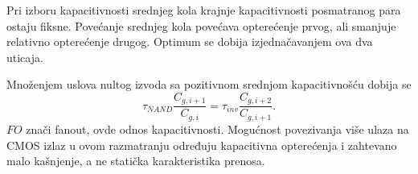 Pri izboru kapacitivnosti srednjeg kola krajnje kapacitivnosti posmatranog para ostaju fiksne. Povećanje srednjeg kola povećava opterećenje prvog, ali smanjuje relativno opterećenje drugog. Optimum se dobija izjednačavanjem ova dva uticaja.

Množenjem uslova nultog izvoda sa pozitivnom srednjom kapacitivnošću dobija se
\[\tau_{NAND}\frac{C_{g,i+1}}{C_{g,i}}=
\tau_{inv}\frac{C_{g,i+2}}{C_{g,i+1}}.
\]
$FO$ znači fanout, ovde odnos kapacitivnosti. Mogućnost povezivanja više ulaza na CMOS izlaz u ovom razmatranju određuju kapacitivna opterećenja i zahtevano malo kašnjenje, a ne statička karakteristika prenosa.
